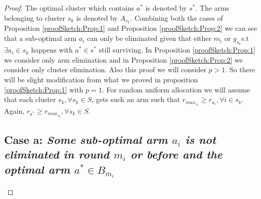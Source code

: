 \begin{proof}
The optimal cluster which contains $a^{*}$ is denoted by $s^{*}$. The arms belonging to cluster $s_{k}$ is denoted by $A_{s_{k}}$. Combining both the cases of Proposition \ref{proofSketch:Prop:1} and Proposition \ref{proofSketch:Prop:2} we can see that a sub-optimal arm $a_{i}$ can only be eliminated given that either $m_{i}$ or $g_{s_{k}}$s.t $\exists a_{i}\in s_{k}$ happens with $a^{*}\in s^{*}$ still surviving. In Proposition \ref{proofSketch:Prop:1} we consider only arm elimination and in Proposition \ref{proofSketch:Prop:2} we consider only cluster elimination. Also this proof we will consider $p>1$. So there will be slight modification from what we proved in proposition \ref{proofSketch:Prop:1} with $p=1$. For random uniform allocation we will assume that each cluster $s_{k},\forall s_{k}\in S$, gets such an arm such that $r_{{max_{s_{k}}}}\geq r_{a_{i}},\forall i\in s_{k}$. Again, $r_{a^{*}}\geq r_{{max_{s_{k}}}}, \forall s_{k}\in S$.
\subsection*{Case a: \textit{Some sub-optimal arm $a_{i}$ is not eliminated in round $m_{i}$ or before and the optimal arm $a^{*}\in B_{m_{i}}$}}
 

\end{proof}
